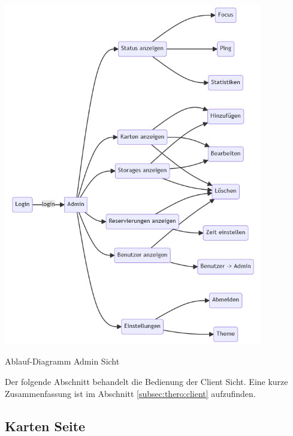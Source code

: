 \begin{flushleft}
\centering
  \includegraphics[width=0.85\textwidth]{FLUTTER/images/ZB/admin_flow_diagram.png}
  \captionsetup{type=figure}
  \caption{Ablauf-Diagramm Admin Sicht \cite{Mermaid}}
\end{flushleft}


\newpage
\label{sec:userguider:clientview}

Der folgende Abschnitt behandelt die Bedienung der Client Sicht. Eine kurze Zusammenfassung ist im Abschnitt {\ref{subsec:thero:client}} aufzufinden.

\subsection{Karten Seite}\label{subsec:kartenseite}

